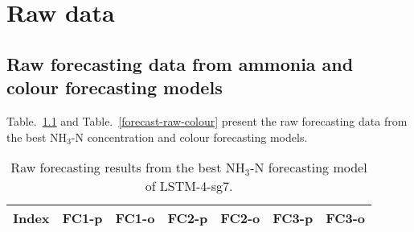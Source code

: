 \chapter{Raw data}
\section{Raw forecasting data from ammonia and colour forecasting models}

Table.~\ref{forecast-raw-nh3} and Table.~\ref{forecast-raw-colour} present the raw forecasting data from the best NH$_{3}$-N concentration and colour forecasting models.

\begin{center}
\begin{longtable}{lcccccc}
\caption{Raw forecasting results from the best NH$_{3}$-N forecasting model of LSTM-4-sg7.} \label{forecast-raw-nh3} \\
\hline
Index & FC1-p \footnotemark[1] & FC1-o \footnotemark[2] & FC2-p \footnotemark[3] & FC2-o \footnotemark[4] & FC3-p \footnotemark[5] & FC3-o \footnotemark[6] \\
\hline
\endfirsthead


\end{longtable}
\end{center}
